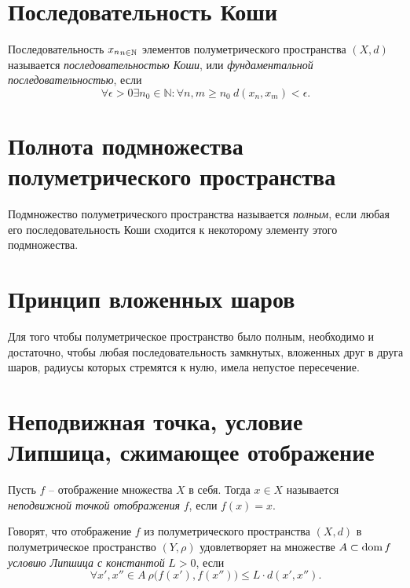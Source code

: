 \section{Последовательность Коши}

\begin{definition}
  Последовательность ${x_n}_{n\in\mathbb{N}}$ элементов полуметрического пространства $(X,d)$ называется \emph{последовательностью Коши}, или \emph{фундаментальной последовательностью}, если
  \[
    \forall \epsilon > 0 \exists n_0 \in \mathbb{N} : \forall n,m \geqslant n_0 \ d(x_n,x_m) < \epsilon.
  \]
\end{definition}

\section{Полнота подмножества полуметрического пространства}

\begin{definition}
  Подмножество полуметрического пространства называется \emph{полным}, если любая его последовательность Коши сходится к некоторому элементу этого подмножества.
\end{definition}

\section{Принцип вложенных шаров}

\begin{theorem}
  Для того чтобы полуметрическое пространство было полным, необходимо и достаточно, чтобы любая последовательность замкнутых, вложенных друг в друга шаров, радиусы которых стремятся к нулю, имела непустое пересечение.
\end{theorem}

\section{Неподвижная точка, условие Липшица, сжимающее отображение}

\begin{definition}
  Пусть $f$ -- отображение множества $X$ в себя. Тогда $x \in X$ называется \emph{неподвижной точкой отображения} $f$, если $f(x) = x$.
\end{definition}

\begin{definition}
  Говорят, что отображение $f$ из полуметрического пространства $(X,d)$ в полуметрическое пространство $(Y,\rho )$ удовлетворяет на множестве $A \subset \operatorname{dom} f$ \emph{условию Липшица с константой} $L>0$, если
  \[
    \forall x ', x '' \in A \ \rho \big(f(x '), f(x '')\big) \leqslant L \cdot d (x ', x ''). 
  \]
\end{definition}

